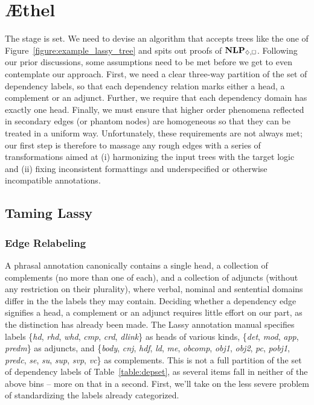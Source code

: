 \section{\AE thel}
The stage is set.
We need to devise an algorithm that accepts trees like the one of Figure~\ref{figure:example_lassy_tree} and spits out proofs of $\NLP_{\diamond,\bx}$.
Following our prior discussions, some assumptions need to be met before we get to even contemplate our approach.
First, we need a clear three-way partition of the set of dependency labels, so that each dependency relation marks either a head, a complement or an adjunct.
Further, we require that each dependency domain has exactly one head.
Finally, we must ensure that higher order phenomena reflected in secondary edges (or phantom nodes) are homogeneous so that they can be treated in a uniform way.
Unfortunately, these requirements are not always met; our first step is therefore to massage any rough edges with a series of transformations aimed at (i) harmonizing the input trees with the target logic and (ii) fixing inconsistent formattings and underspecified or otherwise incompatible annotations. 

\subsection{Taming Lassy}
\subsubsection{Edge Relabeling}
A phrasal annotation canonically contains a single head, a collection of complements (no more than one of each), and a collection of adjuncts (without any restriction on their plurality), where verbal, nominal and sentential domains differ in the the labels they may contain.
Deciding whether a dependency edge signifies a head, a complement or an adjunct requires little effort on our part, as the distinction has already been made.
The Lassy annotation manual specifies labels \{\textit{hd}, \textit{rhd}, \textit{whd}, \textit{cmp}, \textit{crd}, \textit{dlink}\} as heads of various kinds, \{\textit{det}, \textit{mod}, \textit{app}, \textit{predm}\} as adjuncts, and \{\textit{body}, \textit{cnj}, \textit{hdf}, \textit{ld}, \textit{me}, \textit{obcomp}, \textit{obj1}, \textit{obj2}, \textit{pc}, \textit{pobj1}, \textit{predc}, \textit{se}, \textit{su}, \textit{sup}, \textit{svp}, \textit{vc}\} as complements.
This is not a full partition of the set of dependency labels of Table~\ref{table:depset}, as several items fall in neither of the above bins -- more on that in a second.
First, we'll take on the less severe problem of standardizing the labels already categorized.


